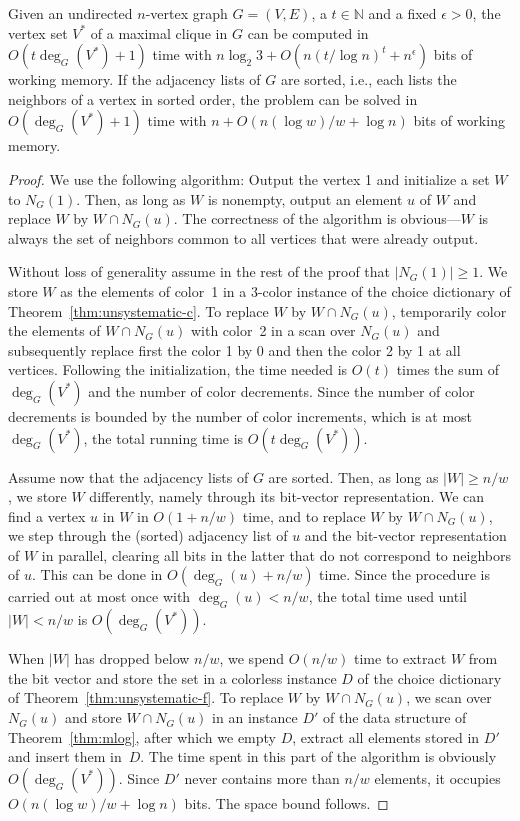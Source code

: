 \documentclass[envcountsame,envcountsect,undated,nolinenumbers]{lnthi}
\def\TbbbN{\mathbb{N}}
\begin{document}
\begin{theorem}
\label{thm:clique}Given an undirected $n$-vertex graph $G=(V,E)$,
a $t\in\TbbbN$ and a fixed $\epsilon>0$,
the vertex set $V^*$ of a maximal clique in $G$
can be computed in $O(t\deg_G(V^*)+1)$ time
with $n\log_2 3+O(n({t/{\log n}})^t+n^\epsilon)$ bits of working memory.
If the adjacency lists of $G$ are sorted, i.e.,
each lists the neighbors of a vertex in sorted order,
the problem can be solved in $O(\deg_G(V^*)+1)$ time with
$n+O({{n(\log w)}/w}+\log n)$ bits of working memory.
\end{theorem}

\begin{proof}
We use the following algorithm:
Output the vertex 1 and initialize a set
$W$ to $N_G(1)$.
Then, as long as $W$ is nonempty,
output an element $u$ of $W$ and replace
$W$ by $W\cap N_G(u)$.
The correctness of the algorithm
is obvious---$W$ is always the set of neighbors common to all vertices that
were already output.

Without loss of generality assume in the
rest of the proof that $|N_G(1)|\ge 1$.
We store $W$ as the elements of
color~1 in a 3-color
instance of the choice dictionary
of Theorem~\ref{thm:unsystematic-c}.
To replace $W$ by $W\cap N_G(u)$,
temporarily color the elements of $W\cap N_G(u)$
with color~2 in a scan over $N_G(u)$
and subsequently replace
first the color 1 by 0 and then the
color 2 by 1 at all vertices.
Following the initialization,
the time needed is $O(t)$ times the sum of
$\deg_G(V^*)$
and the number of color decrements.
Since the number of color decrements is bounded by
the number of color increments,
which is at most $\deg_G(V^*)$,
the total running time is
$O(t\deg_G(V^*))$.

Assume now that the adjacency lists of $G$ are sorted.
Then, as long as $|W|\ge{n/w}$, we store $W$
differently, namely through its bit-vector representation.
We can find a vertex $u$ in $W$ in $O(1+{n/w})$ time,
and to replace $W$ by $W\cap N_G(u)$, we step
through the (sorted) adjacency list of $u$
and the bit-vector representation of $W$ in parallel,
clearing all bits in the latter that do not
correspond to neighbors of $u$.
This can be done in $O(\deg_G(u)+{n/w})$ time.
Since the procedure is carried out at most once
with $\deg_G(u)<{n/w}$, the total time used
until $|W|<{n/w}$ is $O(\deg_G(V^*))$.

When $|W|$ has dropped below ${n/w}$, we spend $O({n/w})$
time to extract $W$ from the bit vector and store the
set in a colorless instance $D$ of the choice dictionary
of Theorem~\ref{thm:unsystematic-f}.
To replace $W$ by $W\cap N_G(u)$, we scan
over $N_G(u)$ and store $W\cap N_G(u)$ in an instance $D'$
of the data structure of Theorem~\ref{thm:mlog},
after which we empty $D$, extract all elements
stored in $D'$ and insert them in~$D$.
The time spent in this part of the algorithm
is obviously $O(\deg_G(V^*))$.
Since $D'$ never contains more than $n/w$ elements,
it occupies $O({{n(\log w)}/w}+\log n)$ bits.
The space bound follows.
\end{proof}


\end{document}
